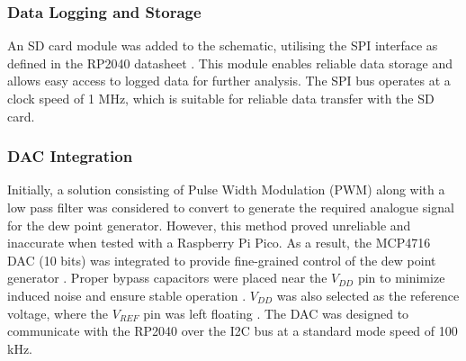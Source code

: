 \subsubsection{Data Logging and Storage}

An SD card module was added to the schematic, utilising the 
SPI interface as defined in the RP2040 datasheet \cite{RaspberryPiRP2040}. This module enables reliable data storage 
and allows easy access to logged data for further analysis. The SPI bus operates at a clock 
speed of 1 MHz, which is suitable for reliable data transfer with the SD card.

\subsubsection{DAC Integration}

Initially, a solution consisting of Pulse Width Modulation (PWM) 
along with a low pass filter was considered to convert to generate the required analogue signal 
for the dew point generator. However, this method proved unreliable and inaccurate when tested 
with a Raspberry Pi Pico. As a result, the MCP4716 DAC (10 bits) was integrated to provide fine-grained control of 
the dew point generator \cite{DAC_datasheet}. Proper bypass capacitors were placed near the $V_{DD}$ pin 
to minimize induced noise and ensure stable operation \cite{DAC_datasheet}. $V_{DD}$ was also selected as the reference voltage, where 
the $V_{REF}$ pin was left floating \cite{DAC_datasheet}. The DAC was designed to communicate with the RP2040 
over the I2C bus at a standard mode speed of 100 kHz.